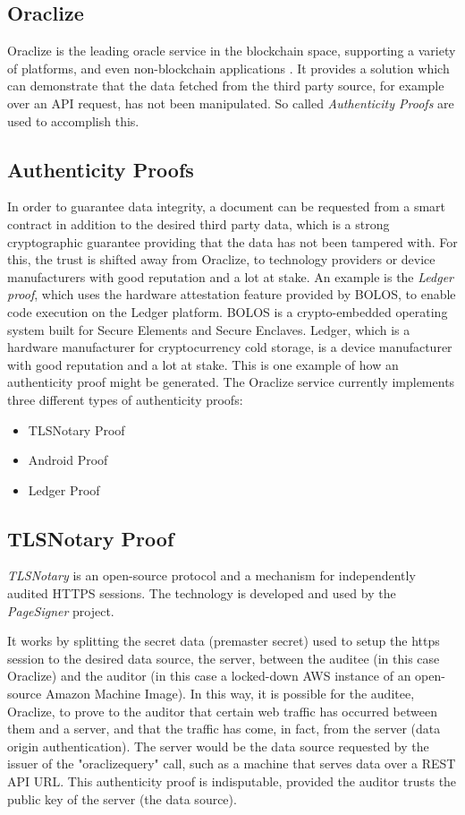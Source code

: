 \subsection{Oraclize}
Oraclize is the leading oracle service in the blockchain space, supporting a variety of platforms, and even non-blockchain applications \cite{oraclizedoc}. It provides a solution which can demonstrate that the data fetched from the third party source, for example over an API request, has not been manipulated. So called \emph{Authenticity Proofs} are used to accomplish this.
\subsection*{Authenticity Proofs}
In order to guarantee data integrity, a document can be requested from a smart contract in addition to the desired third party data, which is a strong cryptographic guarantee providing that the data has not been tampered with. For this, the trust is shifted away from Oraclize, to technology providers or device manufacturers with good reputation and a lot at stake. An example is the \emph{Ledger proof}, which uses the hardware attestation feature provided by BOLOS, to enable code execution on the Ledger platform. BOLOS is a crypto-embedded operating system built for Secure Elements and Secure Enclaves. Ledger, which is a hardware manufacturer for cryptocurrency cold storage, is a device manufacturer with good reputation and a lot at stake. This is one example of how an authenticity proof might be generated. The Oraclize service currently implements three different types of authenticity proofs:
\begin{itemize}
	\item TLSNotary Proof
	\item Android Proof
	\item Ledger Proof
\end{itemize}
\subsection*{TLSNotary Proof}
\emph{TLSNotary} is an open-source protocol and a mechanism for independently audited HTTPS sessions. The technology is developed and used by the \emph{PageSigner} project\cite{pagesigner}. 

It works by splitting the secret data (premaster secret) used to setup the https session to the desired data source, \ie the server, between the auditee (in this case Oraclize) and the auditor (in this case a locked-down AWS instance of an open-source Amazon Machine Image). In this way, it is possible for the auditee, Oraclize, to prove to the auditor that certain web traffic has occurred between them and a server, and that the traffic has come, in fact, from the server (data origin authentication). The server would be the data source requested by the issuer of the "oraclize\textunderscore query" call, such as a machine that serves data over a REST API URL. This authenticity proof is indisputable, provided the auditor trusts the public key of the server (the data source)\cite{tlsnotarywhitepaper}\cite{oraclizedoc}.

